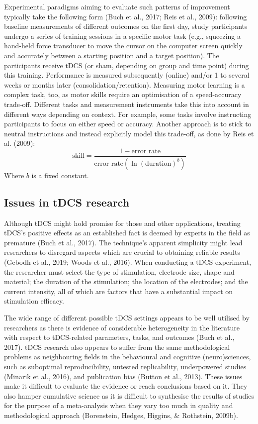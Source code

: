 \documentclass[
  man,floatsintext]{apa6}
\begin{document}
Experimental paradigms aiming to evaluate such patterns of improvement typically take the following form (Buch et al., 2017; Reis et al., 2009): following baseline measurements of different outcomes on the first day, study participants undergo a series of training sessions in a specific motor task (e.g., squeezing a hand-held force transducer to move the cursor on the computer screen quickly and accurately between a starting position and a target position). The participants receive tDCS (or sham, depending on group and time point) during this training. Performance is measured subsequently (online) and/or 1 to several weeks or months later (consolidation/retention).
Measuring motor learning is a complex task, too, as motor skills require an optimisation of a speed-accuracy trade-off. Different tasks and measurement instruments take this into account in different ways depending on context. For example, some tasks involve instructing participants to focus on either speed or accuracy. Another approach is to stick to neutral instructions and instead explicitly model this trade-off, as done by Reis et al. (2009):
\[ 
\textrm{skill} = \frac{1-\textrm{error rate}}{\textrm{error rate}(\ln(\textrm{duration})^b)}
\tag{1}
\]
Where \(b\) is a fixed constant.

\newpage

\hypertarget{issues-in-tdcs-research}{%
\subsection{Issues in tDCS research}\label{issues-in-tdcs-research}}

Although tDCS might hold promise for those and other applications, treating tDCS's positive effects as an established fact is deemed by experts in the field as premature (Buch et al., 2017). The technique's apparent simplicity might lead researchers to disregard aspects which are crucial to obtaining reliable results (Gebodh et al., 2019; Woods et al., 2016). When conducting a tDCS experiment, the researcher must select the type of stimulation, electrode size, shape and material; the duration of the stimulation; the location of the electrodes; and the current intensity, all of which are factors that have a substantial impact on stimulation efficacy.

The wide range of different possible tDCS settings appears to be well utilised by researchers as there is evidence of considerable heterogeneity in the literature with respect to tDCS-related parameters, tasks, and outcomes (Buch et al., 2017). tDCS research also appears to suffer from the same methodological problems as neighbouring fields in the behavioural and cognitive (neuro)sciences, such as suboptimal reproducibility, untested replicability, underpowered studies (Minarik et al., 2016), and publication bias (Button et al., 2013). These issues make it difficult to evaluate the evidence or reach conclusions based on it. They also hamper cumulative science as it is difficult to synthesise the results of studies for the purpose of a meta-analysis when they vary too much in quality and methodological approach (Borenstein, Hedges, Higgins, \& Rothstein, 2009b).
\end{document}
